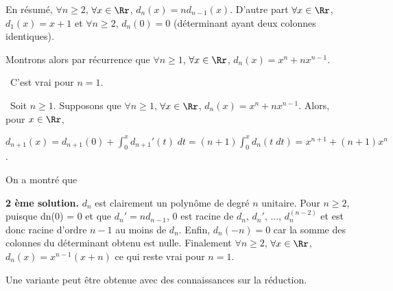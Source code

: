 {\begin{enumerate}
{En résumé, $\forall n\geqslant 2$, $\forall x\in\Rr$, $d_n(x)=nd_{n-1}(x)$. D'autre part $\forall x\in\Rr$, $d_1(x)=x+1$ et $\forall n\geqslant 2$, $d_n(0) = 0$ (déterminant ayant deux colonnes identiques).

Montrons alors par récurrence que 
$\forall n\geqslant 1$, $\forall x\in\Rr$, $d_n(x) =x^n+nx^{n-1}$.

\textbullet~C'est vrai pour $n=1$.

\textbullet~Soit $n\geqslant1$. Supposons que $\forall n\geqslant 1$, $\forall x\in\Rr$, $d_n(x) =x^n+nx^{n-1}$. Alors, pour $x\in\Rr$,

\begin{center}
$d_{n+1}(x)=d_{n+1}(0)+\int_{0}^{x}d_{n+1}'(t)\;dt=(n+1)\int_{0}^{x}d_n(t\;dt)=x^{n+1}+(n+1)x^n$.
\end{center}

On a montré que

\begin{center}
\end{center}

\textbf{2 ème solution.} $d_n$ est clairement un polynôme de degré $n$ unitaire.
Pour $n\geqslant 2$, puisque dn(0) = 0 et que $d_n'= nd_{n-1}$, $0$ est racine de $d_n$, $d_n'$, ..., $d_n^{(n-2)}$ et est donc racine d'ordre $n-1$ au moins de $d_n$. 
Enfin, $d_n(-n)=0$ car la somme des colonnes du déterminant obtenu est nulle.
Finalement $\forall n\geqslant2$, $\forall x\in\Rr$, $d_n(x) = x^{n-1}(x+n)$ ce qui reste vrai pour $n=1$.

Une variante peut être obtenue avec des connaissances sur la réduction.}
\end{enumerate}
}